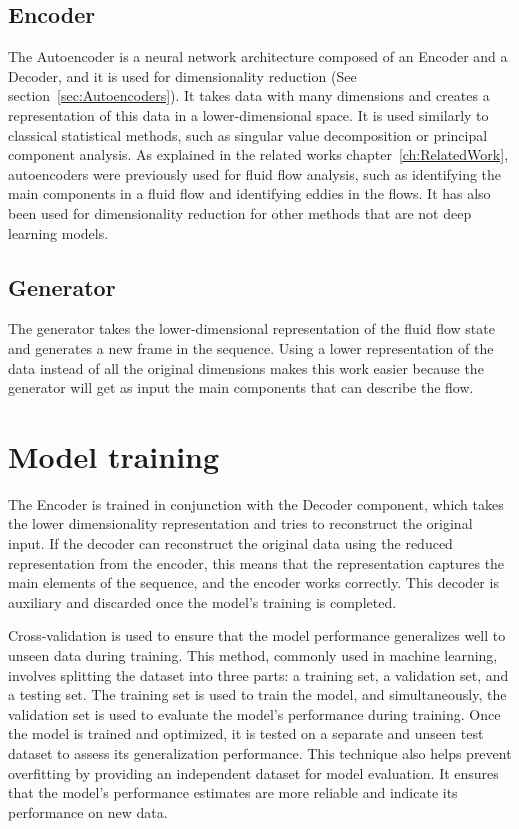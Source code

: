 \subsection{Encoder}
\label{subsec:Encoder}
The Autoencoder is a neural network architecture composed of an Encoder and a Decoder, and it is used for dimensionality reduction (See section~\ref{sec:Autoencoders}). It takes data with many dimensions and creates a representation of this data in a lower-dimensional space. It is used similarly to classical statistical methods, such as singular value decomposition or principal component analysis. As explained in the related works chapter~\ref{ch:RelatedWork}, autoencoders were previously used for fluid flow analysis, such as identifying the main components in a fluid flow and identifying eddies in the flows. It has also been used for dimensionality reduction for other methods that are not deep learning models. 


\subsection{Generator}
\label{subsec:Generator}
The generator takes the lower-dimensional representation of the fluid flow state and generates a new frame in the sequence. Using a lower representation of the data instead of all the original dimensions makes this work easier because the generator will get as input the main components that can describe the flow. 


\section{Model training}
\label{sec:ModelTraining}
The Encoder is trained in conjunction with the Decoder component, which takes the lower dimensionality representation and tries to reconstruct the original input. If the decoder can reconstruct the original data using the reduced representation from the encoder, this means that the representation captures the main elements of the sequence, and the encoder works correctly. This decoder is auxiliary and discarded once the model’s training is completed.

Cross-validation \cite{bengio_practical_2012} is used to ensure that the model performance generalizes well to unseen data during training. This method, commonly used in machine learning, involves splitting the dataset into three parts: a training set, a validation set, and a testing set. The training set is used to train the model, and simultaneously, the validation set is used to evaluate the model's performance during training. Once the model is trained and optimized, it is tested on a separate and unseen test dataset to assess its generalization performance. This technique also helps prevent overfitting by providing an independent dataset for model evaluation. It ensures that the model's performance estimates are more reliable and indicate its performance on new data.

